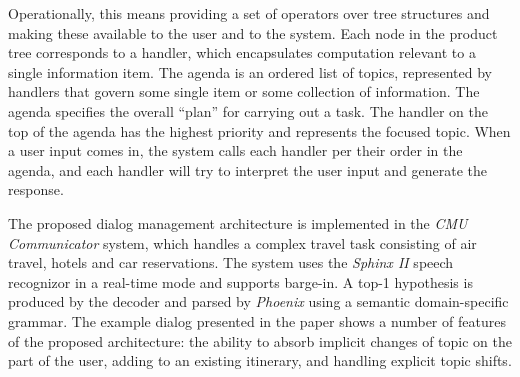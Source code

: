 Operationally, this means providing a set of operators over tree structures and making these available to the user and to the system. Each node in the product tree corresponds to a handler, which encapsulates computation relevant to a single information item. The agenda is an ordered list of topics, represented by handlers that govern some single item or some collection of information. The agenda specifies the overall ``plan'' for carrying out a task.
The handler on the top of the agenda has the highest priority and represents the focused topic. When a user input comes in, the system calls each handler per their order in the agenda, and each handler will try to interpret the user input and generate the response.

The proposed dialog management architecture is implemented in the \emph{CMU Communicator} system, which handles a complex travel task consisting of air travel, hotels and car reservations. The system uses the \emph{Sphinx II} speech recognizor in a real-time mode and supports barge-in. A top-1 hypothesis is produced by the decoder and parsed by \emph{Phoenix} using a semantic domain-specific grammar. The example dialog presented in the paper shows a number of features of the proposed architecture: the ability to absorb implicit changes of topic on the part of the user, adding to an existing itinerary, and handling explicit topic shifts.
